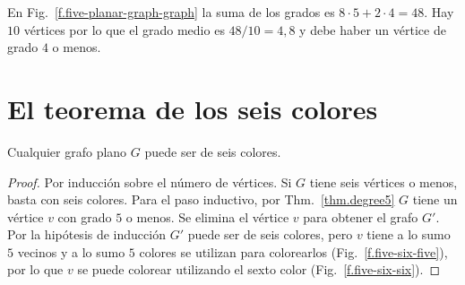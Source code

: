 \begin{example}
En Fig.~\ref{f.five-planar-graph-graph} la suma de los grados es $8\cdot 5 + 2\cdot 4=48$. Hay $10$ vértices por lo que el grado medio es $48/10=4,8$ y debe haber un vértice de grado $4$ o menos.
\end{example}


\section{El teorema de los seis colores}\label{s.six-color}

\begin{theorem}\label{thm.sixcolor}
Cualquier grafo plano $G$ puede ser de seis colores.
\end{theorem}
\begin{proof}
Por inducción sobre el número de vértices. Si $G$ tiene seis vértices o menos, basta con seis colores.
Para el paso inductivo, por Thm.~\ref{thm.degree5} $G$ tiene un vértice $v$ con grado $5$ o menos. Se elimina el vértice $v$ para obtener el grafo $G'$. Por la hipótesis de inducción $G'$ puede ser de seis colores, pero $v$ tiene a lo sumo $5$ vecinos y a lo sumo $5$ colores se utilizan para colorearlos (Fig.~\ref{f.five-six-five}), por lo que $v$ se puede colorear utilizando el sexto color (Fig.~\ref{f.five-six-six}).
\end{proof}

